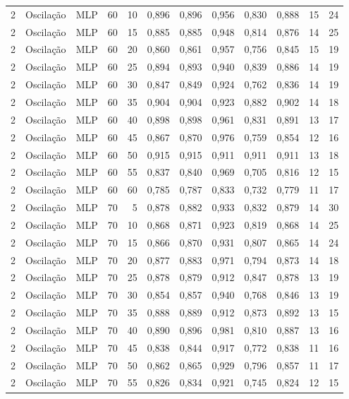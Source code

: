 \begin{longtable}{@{}rllrrrrrrrrr@{}}
2 & Oscilação & MLP & 60 & 10 & 0,896 & 0,896 & 0,956 & 0,830 & 0,888 & 15 & 24 \\
2 & Oscilação & MLP & 60 & 15 & 0,885 & 0,885 & 0,948 & 0,814 & 0,876 & 14 & 25 \\
2 & Oscilação & MLP & 60 & 20 & 0,860 & 0,861 & 0,957 & 0,756 & 0,845 & 15 & 19 \\
2 & Oscilação & MLP & 60 & 25 & 0,894 & 0,893 & 0,940 & 0,839 & 0,886 & 14 & 19 \\
2 & Oscilação & MLP & 60 & 30 & 0,847 & 0,849 & 0,924 & 0,762 & 0,836 & 14 & 19 \\
2 & Oscilação & MLP & 60 & 35 & 0,904 & 0,904 & 0,923 & 0,882 & 0,902 & 14 & 18 \\
2 & Oscilação & MLP & 60 & 40 & 0,898 & 0,898 & 0,961 & 0,831 & 0,891 & 13 & 17 \\
2 & Oscilação & MLP & 60 & 45 & 0,867 & 0,870 & 0,976 & 0,759 & 0,854 & 12 & 16 \\
2 & Oscilação & MLP & 60 & 50 & 0,915 & 0,915 & 0,911 & 0,911 & 0,911 & 13 & 18 \\
2 & Oscilação & MLP & 60 & 55 & 0,837 & 0,840 & 0,969 & 0,705 & 0,816 & 12 & 15 \\
2 & Oscilação & MLP & 60 & 60 & 0,785 & 0,787 & 0,833 & 0,732 & 0,779 & 11 & 17 \\
2 & Oscilação & MLP & 70 & 5 & 0,878 & 0,882 & 0,933 & 0,832 & 0,879 & 14 & 30 \\
2 & Oscilação & MLP & 70 & 10 & 0,868 & 0,871 & 0,923 & 0,819 & 0,868 & 14 & 25 \\
2 & Oscilação & MLP & 70 & 15 & 0,866 & 0,870 & 0,931 & 0,807 & 0,865 & 14 & 24 \\
2 & Oscilação & MLP & 70 & 20 & 0,877 & 0,883 & 0,971 & 0,794 & 0,873 & 14 & 18 \\
2 & Oscilação & MLP & 70 & 25 & 0,878 & 0,879 & 0,912 & 0,847 & 0,878 & 13 & 19 \\
2 & Oscilação & MLP & 70 & 30 & 0,854 & 0,857 & 0,940 & 0,768 & 0,846 & 13 & 19 \\
2 & Oscilação & MLP & 70 & 35 & 0,888 & 0,889 & 0,912 & 0,873 & 0,892 & 13 & 15 \\
2 & Oscilação & MLP & 70 & 40 & 0,890 & 0,896 & 0,981 & 0,810 & 0,887 & 13 & 16 \\
2 & Oscilação & MLP & 70 & 45 & 0,838 & 0,844 & 0,917 & 0,772 & 0,838 & 11 & 16 \\
2 & Oscilação & MLP & 70 & 50 & 0,862 & 0,865 & 0,929 & 0,796 & 0,857 & 11 & 17 \\
2 & Oscilação & MLP & 70 & 55 & 0,826 & 0,834 & 0,921 & 0,745 & 0,824 & 12 & 15 \\

\end{longtable}

